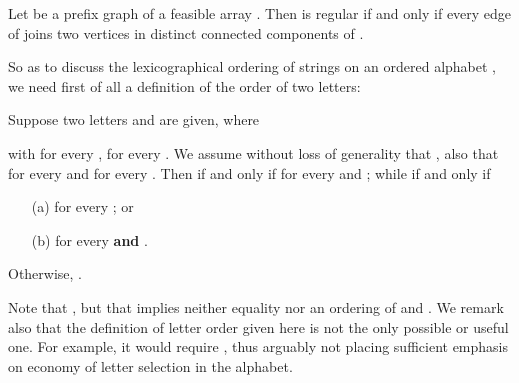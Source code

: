 \documentclass[runningheads,a4paper]{llncs}
\def\qedbox#1#2{\vbox{\hrule height.2pt
  \hbox{\vrule width.2pt height#2pt \kern#1pt \vrule width.2pt}
  \hrule height.2pt}}
\def\qed{\hfill \quad\qedbox46\newline\smallbreak}
\def\s#1{\mbox{\boldmath }}
\newif\ifProofs
\begin{document}
\begin{lemma}
\label{lemm-reg}
Let  be a prefix graph of a feasible array
\s{y}. Then \s{y} is regular if and only if every edge of 
joins two vertices in distinct connected components of .
\end{lemma}
\ifProofs
\begin{proof}
[if] Suppose that every negative edge
joins two vertices in distinct connected components of .
Form a regular string  as follows: for each component  of , assign a unique identical letter, say , to all positions  for which .  We show that  is the prefix table of  and therefore that  is regular.  Fix a value .  For any  such that ,  is a positive edge.
 Thus  and  are in the same component of , and hence .  We also note
that  is a negative edge
(provided ).
If so, then by hypothesis  and  lie
in disjoint components of , so that,
by the uniqueness of ,
.
This is precisely what we need in order to conclude
that  is the prefix table of .
Since \s{x} is regular, so is \s{y}, as required. \\

\noindent
[only if]
Suppose that \s{y} is regular,
therefore the prefix table of a regular string .
Now consider any negative edge  of the prefix graph 
of \s{y}, so that by Lemma~\ref{lemm-easy}(b)
.
If  and  were in the same component of ,
we would have by Lemma~\ref{lemm-easy}(a)
a path in  joining
 to  consisting of edges  such that .
By the regularity of \s{y}, this requires ,
so that , a contradiction.  \qed

 \end{proof}
\fi



So as to discuss the lexicographical ordering of strings on an ordered alphabet ,
we need first of all a definition of the order of two letters:
\begin{definition}
\label{letterorder}
Suppose two letters  and  are given, where

with  for every ,
 for every .
We assume without loss of generality that ,
also that  for every  and
 for every .
Then  if and only if
 for every  and ; while
 if and only if
\begin{itemize}
\item[(a)]
 for every ; or
\item[(b)]
 for every  {\bf and}
.
\end{itemize}
Otherwise, .
\end{definition}
Note that ,
but that  implies neither equality nor an ordering
of  and .
We remark also that the definition of letter order given here is
not the only possible or useful one.
For example, it would require
, thus arguably not
placing sufficient emphasis on economy of letter selection in the alphabet.
\end{document}
